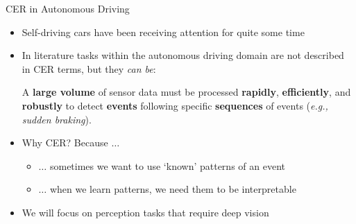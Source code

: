 \documentclass[10pt, aspectratio=169]{beamer}
\begin{document}
\begin{frame}{CER in Autonomous Driving}
    \begin{itemize}
        \setlength{\itemsep}{12pt}
        \item Self-driving cars have been receiving attention for quite some time %
        \item In literature tasks within the autonomous driving domain are not described in CER terms, but they \textit{can be}:  \\
        \vspace{0.6em}
        \begin{center}
         A \textbf{large volume} of sensor data must be processed \textbf{rapidly}, \textbf{efficiently}, and \textbf{robustly} to detect \textbf{events} following specific \textbf{sequences} of events (\textit{e.g., sudden braking}).
          \end{center}
        \item \textcolor{umBlueLighter}{Why CER?} Because $\dots$
        \vspace{0.6em}
            \begin{itemize}
            \setlength{\itemsep}{4pt}
                \item $\dots$ sometimes we want to use `known' patterns of an event
                \item $\dots$ when we learn patterns, we need them to be interpretable
            \end{itemize}
        \item We will focus on perception tasks that require deep vision %
    \end{itemize}
\end{frame}
\end{document}
